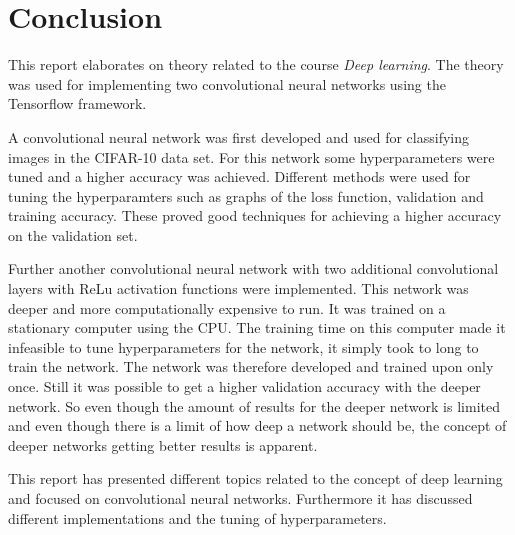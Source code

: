 \chapter{Conclusion}
\label{chp:conc}

This report elaborates on theory related to the course \emph{Deep learning}. The theory was used for implementing two convolutional neural networks using the Tensorflow framework.

A  convolutional neural network was first developed and used for classifying images in the CIFAR-10 data set. For this network some hyperparameters were tuned and a higher accuracy was achieved. Different methods were used for tuning the hyperparamters such as graphs of the loss function, validation and training accuracy. These proved good techniques for achieving a higher accuracy on the validation set.

Further another convolutional neural network with two additional convolutional layers with ReLu activation functions were implemented. This network was deeper and more computationally expensive to run. It was trained on a stationary computer using the CPU. The training time on this computer made it infeasible to tune hyperparameters for the network, it simply took to long to train the network. The network was therefore developed and trained upon only once. Still it was possible to get a higher validation accuracy with the deeper network. So even though the amount of results for the deeper network is limited and even though there is a limit of how deep a network should be, the concept of deeper networks getting better results is apparent. 

This report has presented different topics related to the concept of deep learning and focused on convolutional neural networks. Furthermore it has discussed different implementations and the tuning of hyperparameters. 
